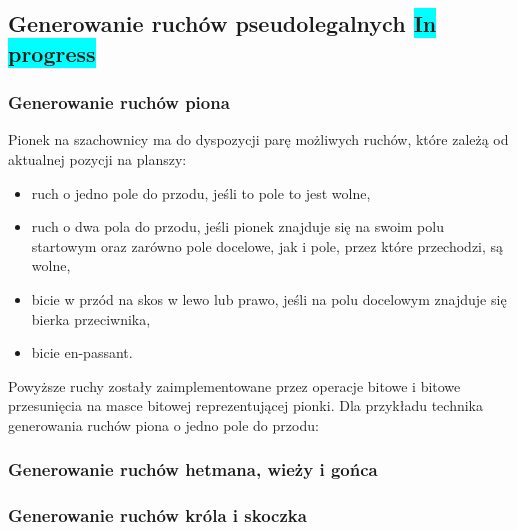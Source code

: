 \subsection{Generowanie ruchów pseudolegalnych \colorbox{cyan}{In progress}}
\label{subsec:generowanie-ruchow-pseudolegalnych}

\subsubsection{Generowanie ruchów piona}

Pionek na szachownicy ma do dyspozycji parę możliwych ruchów, które zależą od aktualnej pozycji na planszy:
\begin{itemize}
    \item ruch o jedno pole do przodu, jeśli to pole to jest wolne,
    \item ruch o dwa pola do przodu, jeśli pionek znajduje się na swoim polu startowym oraz zarówno pole docelowe, jak i pole, przez które przechodzi, są wolne,
    \item bicie w przód na skos w lewo lub prawo, jeśli na polu docelowym znajduje się bierka przeciwnika,
    \item bicie en-passant.
\end{itemize}
Powyższe ruchy zostały zaimplementowane przez operacje bitowe i bitowe przesunięcia na masce bitowej reprezentującej pionki.
Dla przykładu technika generowania ruchów piona o jedno pole do przodu:



\subsubsection{Generowanie ruchów hetmana, wieży i gońca}

\subsubsection{Generowanie ruchów króla i skoczka}

